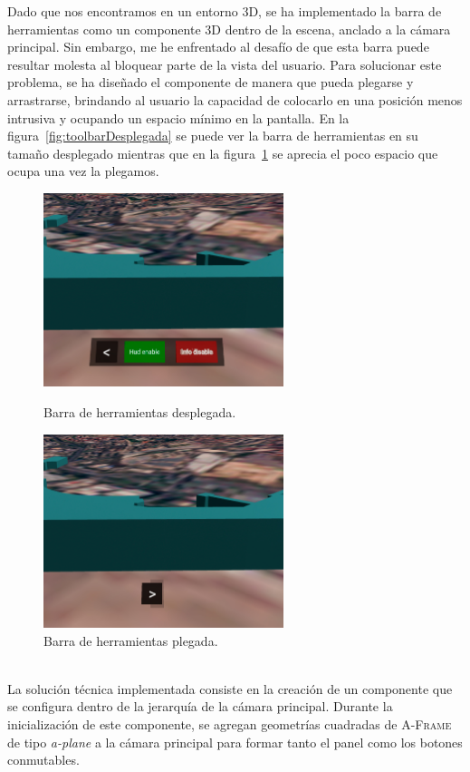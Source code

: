 \documentclass[a4paper, 11pt]{book}
\begin{document}
Dado que nos encontramos en un entorno 3D, se ha implementado la barra de herramientas como un componente 3D dentro de la escena, anclado a la cámara principal. Sin embargo, me he enfrentado al desafío de que esta barra puede resultar molesta al bloquear parte de la vista del usuario. Para solucionar este problema, se ha diseñado el componente de manera que pueda plegarse y arrastrarse, brindando al usuario la capacidad de colocarlo en una posición menos intrusiva y ocupando un espacio mínimo en la pantalla.
En la figura~\ref{fig:toolbarDesplegada} se puede ver la barra de herramientas en su tamaño desplegado mientras que en la figura~\ref{fig:toolbarPlegada} se aprecia el poco espacio que ocupa una vez la plegamos.
\begin{figure}[h]
  \begin{minipage}[t]{0.5\linewidth}
    \centering
    \includegraphics[width=7cm, keepaspectratio]{img/toolbarAbierta.jpg}
    \caption{Barra de herramientas desplegada.}
    \label{fig:toolbarDesplegada}
  \end{minipage}%
  \begin{minipage}[t]{0.5\linewidth}
    \centering
    \includegraphics[width=7cm, keepaspectratio]{img/toolbarPlegada.jpg}
    \caption{Barra de herramientas plegada.}
    \label{fig:toolbarPlegada}    
  \end{minipage}
\end{figure}
\\La solución técnica implementada consiste en la creación de un componente que se configura dentro de la jerarquía de la cámara principal. Durante la inicialización de este componente, se agregan geometrías cuadradas de \textsc{A-Frame} de tipo \emph{a-plane} a la cámara principal para formar tanto el panel como los botones conmutables. 
\end{document}
